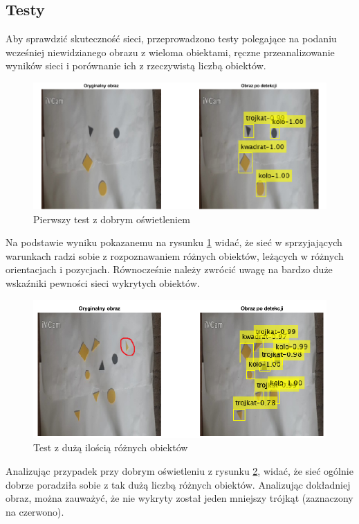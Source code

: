 \subsection{Testy}
Aby sprawdzić skuteczność sieci, przeprowadzono testy polegające na podaniu wcześniej
niewidzianego obrazu z wieloma obiektami, 
ręczne przeanalizowanie wyników sieci i porównanie ich z rzeczywistą liczbą obiektów.
\begin{figure}[H]
	\centering
	\includegraphics[width=15cm]{pages/uczenie/img/testyWynikSieci1.png}
	\caption{Pierwszy test z dobrym oświetleniem}
	\label{fig:testSieci1}
\end{figure}
Na podstawie wyniku pokazanemu na rysunku \ref{fig:testSieci1} widać, że sieć w sprzyjających warunkach radzi sobie z rozpoznawaniem różnych obiektów,
leżących w różnych orientacjach i pozycjach. Równocześnie należy zwrócić uwagę na bardzo duże wskaźniki pewności sieci wykrytych obiektów. 
\begin{figure}[H]
	\centering
	\includegraphics[width=15cm]{pages/uczenie/img/testyWynikSieci2.png}
	\caption{Test z dużą ilością różnych obiektów}
	\label{fig:testSieci2}
\end{figure}
Analizując przypadek przy dobrym oświetleniu z rysunku \ref{fig:testSieci2}, widać, że sieć ogólnie dobrze poradziła sobie z tak dużą liczbą różnych obiektów. 
Analizując dokładniej obraz, można zauważyć, że nie wykryty został jeden mniejszy trójkąt (zaznaczony na czerwono).
